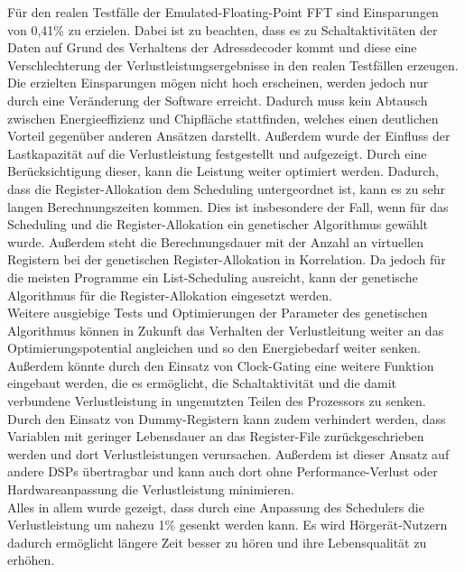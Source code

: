 Für den realen Testfälle der Emulated-Floating-Point FFT sind Einsparungen von 0,41\% zu erzielen. Dabei ist zu beachten, dass es zu Schaltaktivitäten der Daten auf Grund des Verhaltens der Adressdecoder kommt und diese eine Verschlechterung der Verlustleistungsergebnisse in den realen Testfällen erzeugen.
Die erzielten Einsparungen mögen nicht hoch erscheinen, werden jedoch nur durch eine Veränderung der Software erreicht. Dadurch muss kein Abtausch zwischen Energieeffizienz und Chipfläche stattfinden, welches einen deutlichen Vorteil gegenüber anderen Ansätzen darstellt.
Außerdem wurde der Einfluss der Lastkapazität auf die Verlustleistung festgestellt und aufgezeigt. Durch eine Berücksichtigung dieser, kann die Leistung weiter optimiert werden.
Dadurch, dass die Register-Allokation dem Scheduling untergeordnet ist, kann es zu sehr langen Berechnungszeiten kommen. Dies ist insbesondere der Fall, wenn für das Scheduling und die Register-Allokation ein genetischer Algorithmus gewählt wurde. Außerdem steht die Berechnungsdauer mit der Anzahl an virtuellen Registern bei der genetischen Register-Allokation in Korrelation. Da jedoch für die meisten Programme ein List-Scheduling ausreicht, kann der genetische Algorithmus für die Register-Allokation eingesetzt werden.\\
Weitere ausgiebige Tests und Optimierungen der Parameter des genetischen Algorithmus können in Zukunft das Verhalten der Verlustleitung weiter an das Optimierungspotential angleichen und so den Energiebedarf weiter senken. Außerdem könnte durch den Einsatz von Clock-Gating eine weitere Funktion eingebaut werden, die es ermöglicht, die Schaltaktivität und die damit verbundene Verlustleistung in ungenutzten Teilen des Prozessors zu senken. Durch den Einsatz von Dummy-Registern kann zudem verhindert werden, dass Variablen mit geringer Lebensdauer an das Register-File zurückgeschrieben werden und dort Verlustleistungen verursachen. Außerdem ist dieser Ansatz auf andere DSPs übertragbar und kann auch dort ohne Performance-Verlust oder Hardwareanpassung die Verlustleistung minimieren.\\
Alles in allem wurde gezeigt, dass durch eine Anpassung des Schedulers die Verlustleistung um nahezu 1\% gesenkt werden kann. Es wird Hörgerät-Nutzern dadurch ermöglicht längere Zeit besser zu hören und ihre Lebensqualität zu erhöhen.\\
%


